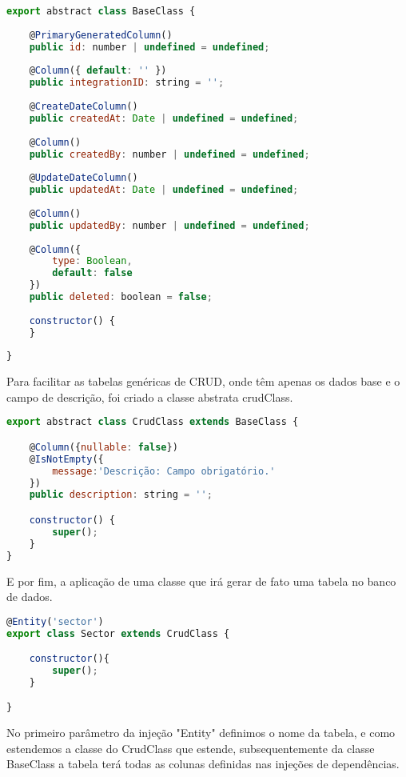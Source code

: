 \begin{lstlisting}[language=JavaScript, caption={BaseClass: Mapeamento de propriedades de tabelas do banco de dados}]
export abstract class BaseClass {
	
	@PrimaryGeneratedColumn()
	public id: number | undefined = undefined;
	
	@Column({ default: '' })
	public integrationID: string = '';
	
	@CreateDateColumn()
	public createdAt: Date | undefined = undefined;
	
	@Column()
	public createdBy: number | undefined = undefined;
	
	@UpdateDateColumn()
	public updatedAt: Date | undefined = undefined;
	
	@Column()
	public updatedBy: number | undefined = undefined;
	
	@Column({
		type: Boolean,
		default: false
	})
	public deleted: boolean = false;
	
	constructor() {
	}
	
}
\end{lstlisting}

Para facilitar as tabelas genéricas de CRUD, onde têm apenas os dados base e o campo de descrição, foi criado a classe abstrata crudClass.

\begin{lstlisting}[language=JavaScript, caption={CrudClass: Mapeamento de propriedades para cruds genéricos}]
export abstract class CrudClass extends BaseClass {

	@Column({nullable: false})
	@IsNotEmpty({
		message:'Descrição: Campo obrigatório.'
	})
	public description: string = '';

	constructor() {
		super();
	}
}
\end{lstlisting}

E por fim, a aplicação de uma classe que irá gerar de fato uma tabela no banco de dados.

\begin{lstlisting}[language=JavaScript, caption={Mapeamento de propriedades da tabela sector}]
@Entity('sector')
export class Sector extends CrudClass {

	constructor(){
		super();
	}

}
\end{lstlisting}

No primeiro parâmetro da injeção "Entity" definimos o nome da tabela, e como estendemos a classe do CrudClass que estende, subsequentemente da classe BaseClass a tabela terá todas as colunas definidas nas injeções de dependências.

